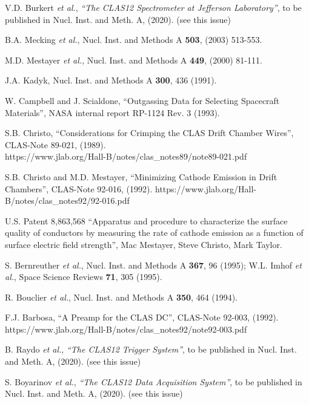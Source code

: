 \begin{thebibliography}{99}

V.D. Burkert {\it et al.}, {\it ``The CLAS12 Spectrometer at Jefferson Laboratory''}, to be published in
Nucl. Inst. and Meth. A, (2020). (see this issue)

B.A. Mecking {\it et al.}, Nucl. Inst. and Methods A {\bf 503}, (2003) 513-553.

M.D. Mestayer {\it et al.}, Nucl. Inst. and Methods A {\bf 449}, (2000) 81-111.

J.A. Kadyk, Nucl. Inst. and Methods A {\bf 300}, 436 (1991).

W. Campbell and J. Scialdone, ``Outgassing Data for Selecting Spacecraft Materials'', NASA internal
report RP-1124 Rev. 3 (1993).

S.B. Christo, ``Considerations for Crimping the CLAS Drift Chamber Wires'', CLAS-Note
89-021, (1989). \\ https://www.jlab.org/Hall-B/notes/clas\_notes89/note89-021.pdf


S.B. Christo and M.D. Mestayer, ``Minimizing Cathode Emission in Drift Chambers'', CLAS-Note 92-016,
(1992). https://www.jlab.org/Hall-B/notes/clas\_notes92/92-016.pdf

U.S. Patent 8,863,568 ``Apparatus and procedure to characterize the surface quality 
of conductors by measuring the rate of cathode emission as a function of surface electric field 
strength'', Mac Mestayer, Steve Christo, Mark Taylor.


S. Bernreuther {\it et al.}, Nucl. Inst. and Methods A {\bf 367}, 96 (1995); W.L. Imhof {\it et al.},
Space Science Reviews {\bf 71}, 305 (1995).

R. Bouclier {\it et al.}, Nucl. Inst. and Methods A {\bf 350}, 464 (1994).

F.J. Barbosa, ``A Preamp for the CLAS DC'', CLAS-Note 92-003, (1992).
https://www.jlab.org/Hall-B/notes/clas\_notes92/note92-003.pdf

B. Raydo {\it et al.}, {\it ``The CLAS12 Trigger System''}, to be published in Nucl. Inst. and Meth. A, (2020).
(see this issue)

S. Boyarinov {\it et al.}, {\it ``The CLAS12 Data Acquisition System''}, to be published in Nucl. Inst.
and Meth. A, (2020). (see this issue)


\end{thebibliography}
